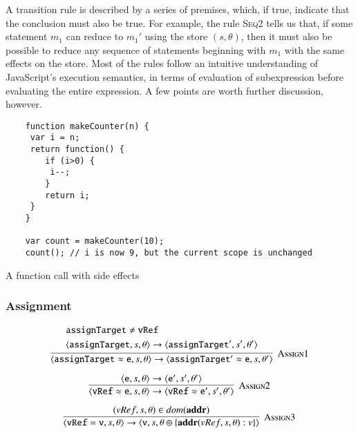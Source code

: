 \documentclass[12pt,a4paper,twoside,openright]{report}
\begin{document}
A transition rule is described by a series of premises, which, if true,
indicate that the conclusion must also be true. For example, the rule
\textsc{Seq2} tells us that, if some statement $m_1$ can reduce to $m_1'$ using
the store $(s,\theta)$, then it must also be possible to reduce any sequence of
statements beginning with $m_1$ with the same effects on the store. Most of the
rules follow an intuitive understanding of JavaScript's execution semantics, in
terms of evaluation of subexpression before evaluating the entire expression. A
few points are worth further discussion, however.

\begin{program}[t]
 \begin{verbatim}
	function makeCounter(n) {
	 var i = n;
	 return function() {
		if (i>0) {
		 i--;
		}
		return i;
	 }
	}

	var count = makeCounter(10);
	count(); // i is now 9, but the current scope is unchanged
 \end{verbatim}
 \caption{A function call with side effects}\label{lst:sideEffects}
\end{program}

\subsubsection*{Assignment}

$$\infer[\textsc{Assign1}]
{
  \langle \mathtt{assignTarget \approx e}, s, \theta \rangle \rightarrow
  \langle \mathtt{assignTarget' \approx e}, s, \theta' \rangle
}
{
  \begin{split}
  	&\mathtt{assignTarget} \not = \mathtt{vRef} \\
  	&\langle \mathtt{assignTarget}, s, \theta \rangle \rightarrow
	  	\langle \mathtt{assignTarget'}, s', \theta'\rangle
  \end{split}
}$$

$$\infer[\textsc{Assign2}]
{
  \langle\mathtt{vRef\approx e},s,\theta\rangle\rightarrow
  	\langle\mathtt{vRef\approx e'},s',\theta'\rangle
}{
	\langle\mathtt{e},s, \theta\rangle\rightarrow
		\langle\mathtt{e'}, s', \theta'\rangle
}$$

$$\infer[\textsc{Assign3}]
{
  \langle \mathtt{vRef = v}, s, \theta \rangle \rightarrow
  	\langle \mathtt{v}, s, \theta\oplus\{\textbf{addr}(vRef, s, \theta) : v\} \rangle
}
{
  (vRef, s, \theta) \in dom(\textbf{addr})
}$$
\end{document}
